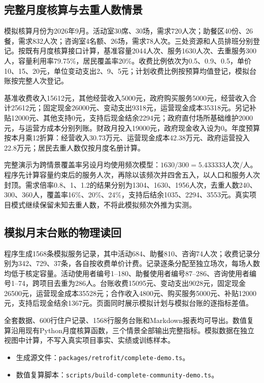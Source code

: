 \subsection{完整月度核算与去重人数情景}
模拟核算月份为2026年9月。活动室30席、30场，需求720人次；助餐区40份、26餐，需求832人次；咨询室4名额、26场，需求78人次。三处资源和人员排班分别登记。按既有月度核算接口计算，基准容量2044人次、服务1630人次、去重服务300人，容量利用率79.75\%，居民覆盖率20\%。收费比例依次为0.5、0.9、0.5，单价10、15、20元，单位变动支出2、9、5元；计划收费比例按预算均值登记，模拟台账按完整人次登记。

基准收费收入15612元，其他经营收入5000元，政府购买服务5000元，经营收入合计25612元；固定现金26000元、变动支出9318元，运营现金成本35318元。另记补贴12000元、其他支持0元，支持后现金结余2294元；政府直付场所基础维护2000元，与运营方成本分别列账。财政月投入19000元，政府现金收入设为0。年度预算按本月乘12折算：经营收入30.73万元、运营现金成本42.38万元、政府运营投入22.8万元；居民去重人数仅按月度名册计算。

完整演示为跨情景覆盖率另设月均使用频次模型：$1630/300=5.433333$人次/人。程序先计算容量约束后的服务人次，再除以该频次并四舍五入，以人口和服务人次封顶。需求倍率0.8、1、1.2的结果分别为1304、1630、1956人次，去重人数240、300、360人，覆盖率16\%、20\%、24\%，支持后结余1035、2294、3553元。真实项目模式继续保留未知去重人数，不将此模拟频次外推为实测。

\subsection{模拟月末台账的物理读回}
程序生成1568条模拟服务记录，其中活动684、助餐810、咨询74人次；收费记录分别为342、729、37条，各自按收费单价计费。记录逐条分配至独立场次，每场人数均低于核定容量。活动使用者编号1--180、助餐使用者编号87--286、咨询使用者编号1--74，跨项目去重为286人。台账收费15095元、变动支出9028元，固定现金26500元，运营现金成本35528元；合作收入4800元、购买服务5000元、补贴12000元，支持后现金结余1367元。页面同时展示模拟计划与模拟台账的逐指标差值。

全套数据、600行住户记录、1568行服务台账和Markdown报表均可导出。数值复算沿用现有Python月度核算函数，三个情景全部输出完整指标。模拟数据在独立视图中计算，不写入真实项目事实、实绩或训练样本。
\begin{itemize}
\item 生成源文件：\texttt{packages/retrofit/complete-demo.ts}。
\item 数值复算脚本：\texttt{scripts/build-complete-community-demo.ts}。
\end{itemize}

